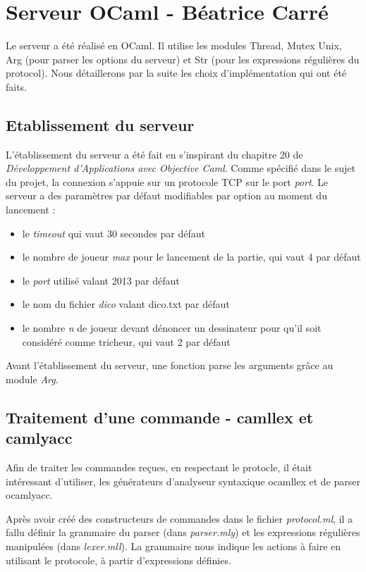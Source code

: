 \documentclass[a4paper, 11pt]{report}
\begin{document}
\chapter{Serveur OCaml - Béatrice Carré}

Le serveur a été réalisé en OCaml. Il utilise les modules Thread, Mutex
Unix, Arg (pour parser les options du serveur) et Str (pour les expressions régulières du protocol).
Nous détaillerons par la suite les choix d'implémentation qui ont été faits.

\section{Etablissement du serveur}

L'établissement du serveur a été fait en s'inspirant du chapitre 20 de
\emph{Développement d'Applications avec Objective Caml}.
Comme spécifié dans le sujet du projet, la connexion s'appuie sur un protocole TCP sur le port \emph{port}.
Le serveur a des paramètres par défaut modifiables par option au
moment du lancement :
\begin{itemize}
\item le \emph{timeout} qui vaut 30 secondes par défaut
\item le nombre de joueur \emph{max} pour le lancement de la partie,
  qui vaut 4 par défaut
\item le \emph{port} utilisé valant 2013 par défaut
\item le nom du fichier \emph{dico} valant dico.txt par défaut
\item le nombre \emph{n} de joueur devant dénoncer un dessinateur pour
  qu'il soit considéré comme tricheur, qui vaut 2 par défaut
\end{itemize}
Avant l'établissement du serveur, une fonction parse les arguments
grâce au module \emph{Arg}.

\section{Traitement d'une commande - camllex et camlyacc}

Afin de traiter les commandes reçues, en respectant le protocle, il
était intéressant d'utiliser, les générateurs d'analyseur syntaxique
ocamllex et de parser ocamlyacc.

Après avoir créé des constructeurs de commandes dans le fichier \emph{protocol.ml}, il a
fallu définir la grammaire du parser (dans \emph{parser.mly}) et les
expressions régulières manipulées (dans \emph{lexer.mll}). La grammaire nous indique les 
actions à faire en utilisant le protocole, à partir d'expressions définies.
\end{document}
